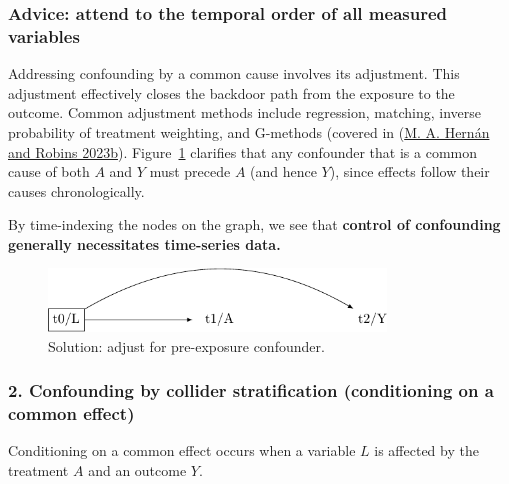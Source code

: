 \documentclass[
  singlecolumn]{article}
\begin{document}
\hypertarget{advice-attend-to-the-temporal-order-of-all-measured-variables}{%
\subsubsection{Advice: attend to the temporal order of all measured
variables}\label{advice-attend-to-the-temporal-order-of-all-measured-variables}}

Addressing confounding by a common cause involves its adjustment. This
adjustment effectively closes the backdoor path from the exposure to the
outcome. Common adjustment methods include regression, matching, inverse
probability of treatment weighting, and G-methods (covered in
(\protect\hyperlink{ref-hernuxe1n2023a}{M. A. Hernán and Robins 2023b}).
Figure~\ref{fig-dag-common-cause-solution} clarifies that any confounder
that is a common cause of both \(A\) and \(Y\) must precede \(A\) (and
hence \(Y\)), since effects follow their causes chronologically.

By time-indexing the nodes on the graph, we see that \textbf{control of
confounding generally necessitates time-series data.}

\begin{figure}

{\centering \includegraphics[width=0.8\textwidth,height=\textheight]{causal-dags_files/figure-pdf/fig-dag-common-cause-solution-1.pdf}

}

\caption{\label{fig-dag-common-cause-solution}Solution: adjust for
pre-exposure confounder.}

\end{figure}

\hypertarget{confounding-by-collider-stratification-conditioning-on-a-common-effect}{%
\subsubsection{2. Confounding by collider stratification (conditioning
on a common
effect)}\label{confounding-by-collider-stratification-conditioning-on-a-common-effect}}

Conditioning on a common effect occurs when a variable \(L\) is affected
by the treatment \(A\) and an outcome \(Y\).
\end{document}
